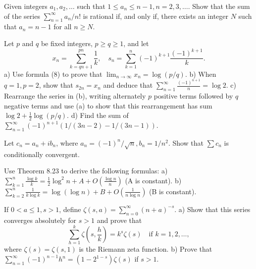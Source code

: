 \begin{problembox}
Given integers \(a_1, a_2, \ldots\) such that \(1 \leq a_n \leq n - 1, n = 2, 3, \ldots\). Show that the sum of the series \(\sum_{n=1}^{\infty} a_n / n!\) is rational if, and only if, there exists an integer \(N\) such that \(a_n = n - 1\) for all \(n \geq N\).
\end{problembox}

\begin{problembox}
Let \(p\) and \(q\) be fixed integers, \(p \geq q \geq 1\), and let
\[x_n = \sum_{k=qn+1}^{pn} \frac{1}{k}, \quad s_n = \sum_{k=1}^{n} (-1)^{k+1} \frac{(-1)^{k+1}}{k}.\]
a) Use formula (8) to prove that \(\lim_{n \to \infty} x_n = \log(p/q)\). 
b) When \(q = 1, p = 2\), show that \(s_{2n} = x_n\) and deduce that \(\sum_{n=1}^{\infty} \frac{(-1)^{n+1}}{n} = \log 2\).
c) Rearrange the series in (b), writing alternately \(p\) positive terms followed by \(q\) negative terms and use (a) to show that this rearrangement has sum \(\log 2 + \frac{1}{2} \log(p/q)\).
d) Find the sum of \(\sum_{n=1}^{\infty} (-1)^{n+1} (1/(3n - 2) - 1/(3n - 1))\).
\end{problembox}

\begin{problembox}
Let \(c_n = a_n + ib_n\), where \(a_n = (-1)^n/\sqrt{n}, b_n = 1/n^2\). Show that \(\sum c_n\) is conditionally convergent.
\end{problembox}

\begin{problembox}
Use Theorem 8.23 to derive the following formulas:
a) \(\sum_{k=1}^{n} \frac{\log k}{k} = \frac{1}{2} \log^2 n + A + O \left( \frac{\log n}{n} \right)\) (A is constant).
b) \(\sum_{k=2}^{n} \frac{1}{k \log k} = \log (\log n) + B + O \left( \frac{1}{n \log n} \right)\) (B is constant).
\end{problembox}

\begin{problembox}
If \(0 < a \leq 1, s > 1\), define \(\zeta(s, a) = \sum_{n=0}^{\infty} (n + a)^{-s}\).
a) Show that this series converges absolutely for \(s > 1\) and prove that
\[\sum_{h=1}^{k} \zeta \left( s, \frac{h}{k} \right) = k^s \zeta(s) \quad \text{if } k = 1, 2, \ldots,\]
where \(\zeta(s) = \zeta(s, 1)\) is the Riemann zeta function.
b) Prove that \(\sum_{n=1}^{\infty} (-1)^{n-1} h^n = (1 - 2^{1-s}) \zeta(s)\) if \(s > 1\).
\end{problembox}

